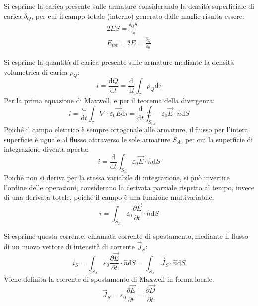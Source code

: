 \documentclass{article}
\newcommand{\df}{\mathrm{d}}
\numberwithin{equation}{subsection}
\begin{document}
Si esprime la carica presente sulle armature considerando la densità superficiale di carica $\delta_Q$, per cui il campo totale (interno) generato dalle maglie risulta essere:
\begin{gather*}
    2ES=\displaystyle\frac{\delta_QS}{\varepsilon_0}\\
    E_{tot}=2E=\displaystyle\frac{\delta_Q}{\varepsilon_0}
\end{gather*}


Si esprime la quantità di carica presente sulle armature mediante la densità volumetrica di carica $\rho_Q$:
\begin{equation*}
    i=\displaystyle\frac{\df Q}{\df t}=\frac{\df}{\df t}\int_{\tau}\rho_Q\df\tau
\end{equation*}
Per la prima equazione di Maxwell, e per il teorema della divergenza: 
\begin{equation*}
    i=\displaystyle\frac{\df}{\df t}\int_{\tau}\nabla\cdot\varepsilon_0\vec{E}\df\tau=\frac{\df}{\df t}\oint_{S_{tot}}\varepsilon_0\vec{E}\cdot\hat{n}\df S
\end{equation*}
Poiché il campo elettrico è sempre ortogonale alle armature, il flusso per l'intera superficie è uguale al flusso attraverso le sole armature $S_A$, per cui la superficie 
di integrazione diventa aperta:
\begin{equation*}
    i=\displaystyle\frac{\df}{\df t}\int_{S_A}\varepsilon_0\vec{E}\cdot\hat{n}\df S
\end{equation*}
Poiché non si deriva per la stessa variabile di integrazione, si può invertire l'ordine delle operazioni, considerano la derivata parziale rispetto al tempo, invece di una 
derivata totale, poiché il campo è una funzione multivariabile:
\begin{equation*}
    i=\displaystyle\int_{S_A}\varepsilon_0\frac{\partial \vec{E}}{\partial t}\cdot\hat{n}\df S
\end{equation*}

Si esprime questa corrente, chiamata corrente di spostamento, mediante il flusso di un nuovo vettore di intensità di corrente $\vec{J}_S$:
\begin{equation*}
    i_S=\displaystyle\int_{S_A}\varepsilon_0\frac{\partial \vec{E}}{\partial t}\cdot\hat{n}\df S=\int_{S_A}\vec{J}_S\cdot\hat{n}\df S
\end{equation*}
Viene definita la corrente di spostamento di Maxwell in forma locale:
\begin{equation}
    \vec{J}_S=\displaystyle\varepsilon_0\frac{\partial \vec{E}}{\partial t}=\frac{\partial \vec{D}}{\partial t}
\end{equation}
\end{document}
